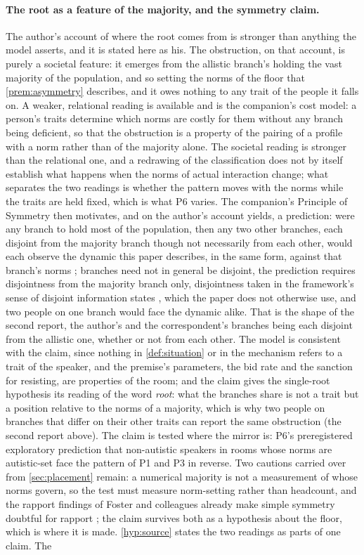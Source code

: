 \paragraph{The root as a feature of the majority, and the symmetry claim.} The author's account of where the root comes from is stronger than anything the model asserts, and it is stated here as his. The obstruction, on that account, is purely a societal feature: it emerges from the allistic branch's holding the vast majority of the population, and so setting the norms of the floor that \autoref{prem:asymmetry} describes, and it owes nothing to any trait of the people it falls on. A weaker, relational reading is available and is the companion's cost model: a person's traits determine which norms are costly for them without any branch being deficient, so that the obstruction is a property of the pairing of a profile with a norm rather than of the majority alone. The societal reading is stronger than the relational one, and a redrawing of the classification does not by itself establish what happens when the norms of actual interaction change; what separates the two readings is whether the pattern moves with the norms while the traits are held fixed, which is what P6 varies. The companion's Principle of Symmetry then motivates, and on the author's account yields, a prediction: were any branch to hold most of the population, then any two other branches, each disjoint from the majority branch though not necessarily from each other, would each observe the dynamic this paper describes, in the same form, against that branch's norms \cite{NormCost}; branches need not in general be disjoint, the prediction requires disjointness from the majority branch only, disjointness taken in the framework's sense of disjoint information states \cite{Aethus}, which the paper does not otherwise use, and two people on one branch would face the dynamic alike. That is the shape of the second report, the author's and the correspondent's branches being each disjoint from the allistic one, whether or not from each other. The model is consistent with the claim, since nothing in \autoref{def:situation} or in the mechanism refers to a trait of the speaker, and the premise's parameters, the bid rate and the sanction for resisting, are properties of the room; and the claim gives the single-root hypothesis its reading of the word \emph{root}: what the branches share is not a trait but a position relative to the norms of a majority, which is why two people on branches that differ on their other traits can report the same obstruction (the second report above). The claim is tested where the mirror is: P6's preregistered exploratory prediction that non-autistic speakers in rooms whose norms are autistic-set face the pattern of P1 and P3 in reverse. Two cautions carried over from \autoref{sec:placement} remain: a numerical majority is not a measurement of whose norms govern, so the test must measure norm-setting rather than headcount, and the rapport findings of Foster and colleagues already make simple symmetry doubtful for rapport \cite{Foster2025}; the claim survives both as a hypothesis about the floor, which is where it is made. \autoref{hyp:source} states the two readings as parts of one claim. The 
